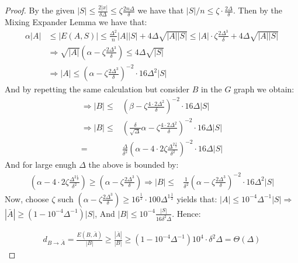  \begin{proof}
   By the given $|S| \le \frac{2|x|}{\delta\Delta} \le \zeta\frac{2n\Delta}{\delta}$ we have that $|S|/n \le \zeta\cdot \frac{2\Delta}{\delta}$.
   Then by the Mixing Expander Lemma we have that:   
   \begin{equation*}
     \begin{split}
       \alpha |A| & \le |E(A,S)| \le \frac{\Delta^{2}}{n}|A||S| + 4 \Delta \sqrt{|A||S|} \le |A| \cdot \zeta \frac{2\Delta^{3}}{\delta} +  4 \Delta \sqrt{|A||S|}\\ 
       & \Rightarrow \sqrt{|A|}\left(\alpha-\zeta \frac{2\Delta^{3}}{\delta}  \right) \le 4\Delta\sqrt{|S|} \\
       & \Rightarrow |A| \le \left( \alpha -  \zeta \frac{2\Delta^{3}}{\delta}  \right)^{-2} \cdot 16\Delta^{2}|S|
     \end{split}
   \end{equation*}
   And by repetting the same calculation but consider $B$ in the $G$ graph we obtain: 
\begin{equation*}
     \begin{split}
       \Rightarrow  |B| \le & \left( \beta -  \zeta \frac{4 \cdot 2\Delta^{2} }{\delta}  \right)^{-2} \cdot 16\Delta|S|\\
       \Rightarrow  |B| \le & \left( \frac{\delta}{\sqrt{\Delta}}\alpha   -  \zeta \frac{4 \cdot 2\Delta^{2} }{\delta}  \right)^{-2} \cdot 16\Delta|S|\\
       = & \frac{\Delta}{\delta^{2}} \left(  \alpha -  4\cdot 2\zeta \frac{\Delta^{2\frac{1}{2}}}{\delta^{2}}   \right)^{-2} \cdot 16\Delta|S| 
     \end{split}
   \end{equation*}
   And for large enugh $\Delta$ the above is bounded by:
   \begin{equation*}
     \begin{split}
     \left(  \alpha -  4\cdot 2\zeta \frac{\Delta^{2\frac{1}{2}}}{\delta^{2}}   \right) \ge \left( \alpha -  \zeta \frac{2\Delta^{3}}{\delta}  \right) \Rightarrow |B|  \le  & \frac{1}{\delta^{2}} \left( \alpha -  \zeta \frac{2\Delta^{3}}{\delta}  \right)^{-2} \cdot 16\Delta^{2}|S| 
     \end{split}
   \end{equation*}
   Now, choose $\zeta$ such $\left( \alpha -  \zeta \frac{2\Delta^{3}}{\delta}  \right) \ge 16^{\frac{1}{2}} \cdot 100 \Delta^{1\frac{1}{2}}$ yields that: $|A| \le 10^{-4}\Delta^{-1} |S| \Rightarrow $$ |\bar{A}| \ge \left( 1 - 10^{-4} \Delta^{-1}\right)|S|$, And $|B| \le 10^{-4} \frac{|S|}{16 \delta^{2}\Delta}$. Hence:

   \begin{equation*}
     \begin{split}
       d_{B\rightarrow \bar{A}} = \frac{ E\left(B,\bar{A}\right) }{|B|} \ge \frac{|\bar{A}|}{|B|} \ge \left( 1 - 10^{-4}\Delta^{-1}  \right) 10^{4} \cdot \delta^{2}\Delta  = \Theta\left( \Delta \right)
     \end{split}
   \end{equation*}
 \end{proof}
